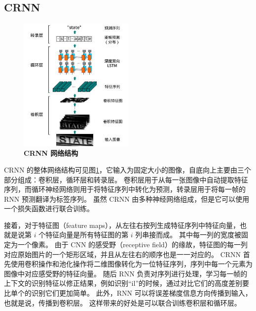 \subsection{CRNN}
\label{crnn}

\begin{figure}[h!]
	\centering
	\includegraphics[width=0.5\textwidth]{figure/resources/CRNN_arch.png}
	\caption{\textbf{CRNN 网络结构}\label{CRNN_arch}}
\end{figure}

CRNN 的整体网络结构可见图\ref{CRNN_arch}，它输入为固定大小的图像，自底向上主要由三个部分组成：卷积层，循环层和转录层。
卷积层用于从每一张图像中自动提取特征序列，而循环神经网络则用于将特征序列中转化为预测，转录层用于将每一帧的 RNN 预测翻译为标签序列。
虽然 CRNN 由多种神经网络组成，但是它可以使用一个损失函数进行联合训练。

接着，对于特征图（feature maps），从左往右按列生成特征序列中特征向量，也就是说第 $i$ 个特征向量是所有特征图的第 $i$ 列串接而成。
其中每一列的宽度被固定为一个像素。
由于 CNN 的感受野（receptive field）的缘故，特征图的每一列对应原始图片的一个矩形区域，并且从左往右的顺序也是一一对应的。
CRNN 首先使用卷积操作和池化操作将二维图像转化为一位特征序列，序列中每一个元素为图像中对应感受野的特征向量。
随后 RNN 负责对序列进行处理，学习每一帧的上下文的识别特征以修正结果，例如识别“il”的时候，通过对比它们的高度差别要比单个的识别它们更加简单。
此外，RNN 可以将误差梯度信息方向传播到输入，也就是说，传播到卷积层。
这样带来的好处是可以联合训练卷积层和循环层。

